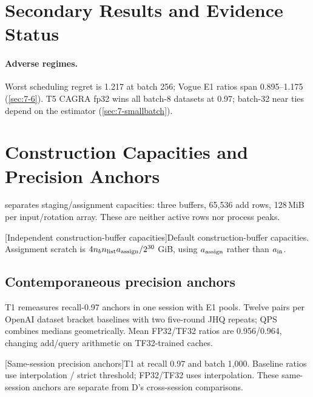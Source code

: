 \section{Secondary Results and Evidence Status}
\label{sec:b-secondary}
\paragraph{Adverse regimes.}
Worst scheduling regret is 1.217 at batch 256; Vogue E1 ratios span 0.895--1.175 (\cref{sec:7-6}). T5 CAGRA fp32 wins all batch-8 datasets at 0.97; batch-32 near ties depend on the estimator (\cref{sec:7-smallbatch}).





\section{Construction Capacities and Precision Anchors}
\label{sec:b-full-review}

 separates staging/assignment capacities: three buffers, 65,536 add rows, 128\,MiB per input/rotation array. These are neither active rows nor process peaks.

\par\medskip\noindent\begin{minipage}{\linewidth}
\centering\captionsetup{hypcap=false}
[Independent construction-buffer capacities]{Default construction-buffer capacities.
Assignment scratch is $4n_b n_{\rm list}a_{\rm assign}/2^{30}$ GiB, using $a_{\rm assign}$ rather than $a_{\rm in}$.}
\label{tab:b-scratch}
\footnotesize
\end{minipage}\par\medskip

\subsection{Contemporaneous precision anchors}
\label{sec:b-precision-anchors}

T1 remeasures recall-0.97 anchors in one session with E1 pools. Twelve pairs per OpenAI dataset bracket baselines with two five-round JHQ repeats; QPS combines medians geometrically. Mean FP32/TF32 ratios are 0.956/0.964, changing add/query arithmetic on TF32-trained caches.

\par\medskip\noindent\begin{minipage}{\linewidth}
\centering\captionsetup{hypcap=false}
[Same-session precision anchors]{T1 at recall 0.97 and batch 1,000.
Baseline ratios use interpolation / strict threshold; FP32/TF32 uses interpolation. These same-session anchors are separate from D's cross-session comparisons.}
\label{tab:b-precision-anchors}
\footnotesize\setlength{\tabcolsep}{3pt}

\end{minipage}\par\medskip

